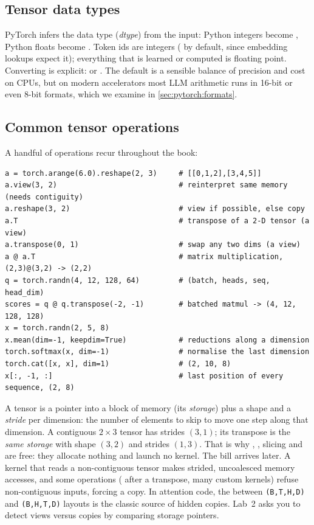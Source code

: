\subsection{Tensor data types}
PyTorch infers the data type (\emph{dtype}) from the input: Python integers become , Python
floats become . Token ids are integers ( by default, since embedding lookups
expect it); everything that is learned or computed is floating point. Converting is explicit:
 or . The default  is a sensible balance of precision
and cost on CPUs, but on modern accelerators most LLM arithmetic runs in 16-bit or even 8-bit formats, which
we examine in \cref{sec:pytorch:formats}.

\subsection{Common tensor operations}
A handful of operations recur throughout the book:

\begin{lstlisting}[caption={Operations used constantly in LLM code.},label={lst:pytorch:ops}]
a = torch.arange(6.0).reshape(2, 3)     # [[0,1,2],[3,4,5]]
a.view(3, 2)                            # reinterpret same memory (needs contiguity)
a.reshape(3, 2)                         # view if possible, else copy
a.T                                     # transpose of a 2-D tensor (a view)
a.transpose(0, 1)                       # swap any two dims (a view)
a @ a.T                                 # matrix multiplication, (2,3)@(3,2) -> (2,2)
q = torch.randn(4, 12, 128, 64)         # (batch, heads, seq, head_dim)
scores = q @ q.transpose(-2, -1)        # batched matmul -> (4, 12, 128, 128)
x = torch.randn(2, 5, 8)
x.mean(dim=-1, keepdim=True)            # reductions along a dimension
torch.softmax(x, dim=-1)                # normalise the last dimension
torch.cat([x, x], dim=1)                # (2, 10, 8)
x[:, -1, :]                             # last position of every sequence, (2, 8)
\end{lstlisting}

\begin{systemslens}
A tensor is a pointer into a block of memory (its \emph{storage}) plus a shape and a \emph{stride} per
dimension: the number of elements to skip to move one step along that dimension. A contiguous
$2\times3$ tensor has strides $(3,1)$; its transpose is the \emph{same storage} with shape $(3,2)$ and strides
$(1,3)$. That is why , , slicing and  are free: they allocate nothing and
launch no kernel. The bill arrives later. A kernel that reads a non-contiguous tensor makes strided,
uncoalesced memory accesses, and some operations ( after a transpose, many custom kernels) refuse
non-contiguous inputs, forcing a  copy. In attention code, the
 between \texttt{(B,T,H,D)} and \texttt{(B,H,T,D)} layouts is the classic source of
hidden copies. Lab~2 asks you to detect views versus copies by comparing storage pointers.
\end{systemslens}

